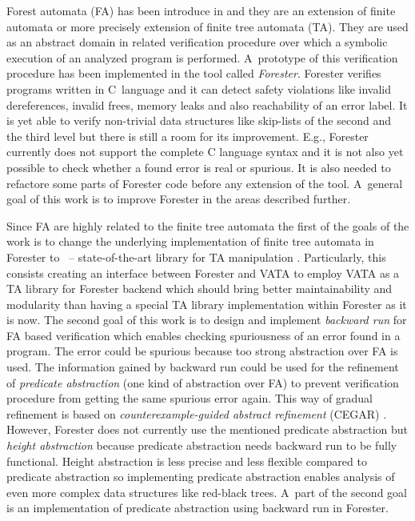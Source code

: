 \documentclass[fleqn,11pt]{ExcelAtFIT} %
\begin{document}
Forest automata (FA) has been introduce in \cite{forester11,forester12} and they are an extension of finite automata or more precisely extension of finite tree automata (TA).
They are used as an abstract domain in related verification procedure over which a symbolic execution of an analyzed program is performed.
A~prototype of this verification procedure has been implemented in the tool called \emph{Forester}.
Forester verifies programs written in C~language and it can detect safety violations like invalid dereferences, invalid frees, memory leaks and also reachability of an error label.
It is yet able to verify non-trivial data structures like skip-lists of the second and the third level
but there is still a room for its improvement.
E.g., Forester currently does not support the complete C language syntax and %
it is not also yet possible to check whether a found error is real or spurious.
It is also needed to refactore some parts of Forester code before any extension of the tool.
A~general goal of this work is to improve Forester in the areas described further.

Since FA are highly related to the finite tree automata the first of the goals of the work is to change
the underlying implementation of finite tree automata in Forester to \vata\ -- state-of-the-art library for TA manipulation \cite{libvata}.
Particularly, this consists creating an interface between Forester and VATA to employ VATA as a TA library for Forester backend
which should bring better maintainability and modularity than having a special TA library implementation within Forester as it is now.
The second goal of this work is to design and implement \emph{backward run} for FA based verification
which enables checking spuriousness of an error found in a program.
The error could be spurious because too strong abstraction over FA is used.
The information gained by backward run could be used for the refinement of \emph{predicate abstraction} (one kind of abstraction over FA)
to prevent verification procedure from getting the same spurious error again.
This way of gradual refinement is based on \emph{counterexample-guided abstract refinement} (CEGAR) \cite{cegar}.
However, Forester does not currently use the mentioned predicate abstraction but \emph{height abstraction} %
because predicate abstraction needs backward run to be fully functional.
Height abstraction is less precise and less flexible compared to predicate abstraction so implementing predicate abstraction
enables analysis of even more complex data structures like red-black trees.
A~part of the second goal is an implementation of predicate abstraction using backward run in Forester.
\end{document}
